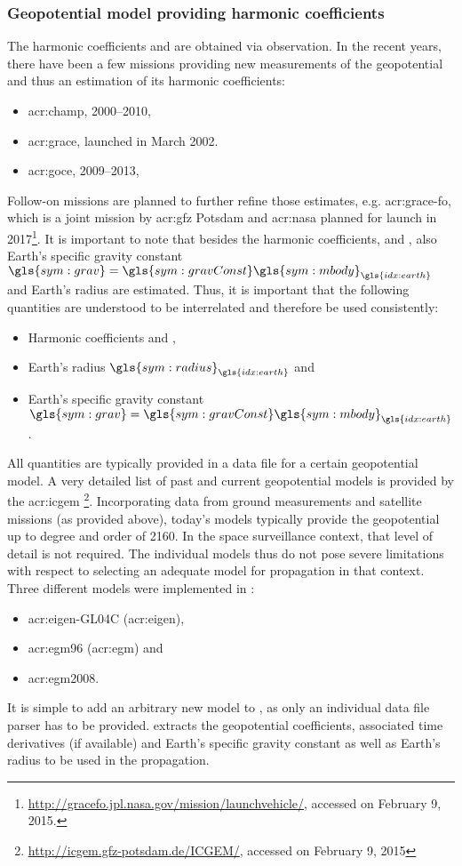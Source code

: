 \subsubsection{Geopotential model providing harmonic coefficients}

The harmonic coefficients \cnm{}{} and \snm{}{} are obtained via observation. In the recent years, there have been a few missions providing new measurements of the geopotential
and thus an estimation of its harmonic coefficients: 
\begin{itemize}
 \item \gls{acr:champ}, \numrange{2000}{2010},
 \item \gls{acr:grace}, launched in March \num{2002}. 
 \item \gls{acr:goce}, \numrange{2009}{2013},
\end{itemize}
Follow-on missions are planned to further refine those estimates, e.g. \gls{acr:grace-fo}, which is a joint mission by \gls{acr:gfz} Potsdam and \gls{acr:nasa} planned for launch
in 2017\footnote{\url{http://gracefo.jpl.nasa.gov/mission/launchvehicle/}, accessed on February 9, 2015.}. It is important to note that besides the harmonic coefficients, \cnm{}{}
and \snm{}{}, also Earth's specific gravity constant $\gls{sym:grav}=\gls{sym:gravConst}\gls{sym:mbody}_{\gls{idx:earth}}$ and Earth's radius are estimated. Thus, it is important
that the following quantities are understood to be interrelated and therefore be used consistently:
\begin{itemize}
 \item Harmonic coefficients \cnm{}{} and \snm{}{},
 \item Earth's radius $\gls{sym:radius}_{\gls{idx:earth}}$ and
 \item Earth's specific gravity constant $\gls{sym:grav}=\gls{sym:gravConst}\gls{sym:mbody}_{\gls{idx:earth}}$.
\end{itemize}
All quantities are typically provided in a data file for a certain geopotential model. A very detailed list of past and current geopotential models is provided by the
\gls{acr:icgem} \footnote{\url{http://icgem.gfz-potsdam.de/ICGEM/}, accessed on February 9, 2015}. Incorporating data from ground measurements and satellite missions (as provided
above), today's models typically provide the geopotential up to degree and order of \num{2160}. In the space surveillance context, that level of detail is not required. The
individual models thus do not pose severe limitations with respect to selecting an adequate model for propagation in that context. Three different models were implemented in
\neptune{}:
\begin{itemize}
 \item \acrshort{acr:eigen}-GL04C (\acrlong{acr:eigen}),
 \item \acrshort{acr:egm}96 (\acrlong{acr:egm}) and
 \item \acrshort{acr:egm}2008.
\end{itemize}
It is simple to add an arbitrary new model to \neptune{}, as only an individual data file parser has to be provided. \neptune{} extracts the geopotential coefficients, associated
time derivatives (if available) and Earth's specific gravity constant as well as Earth's radius to be used in the propagation.

